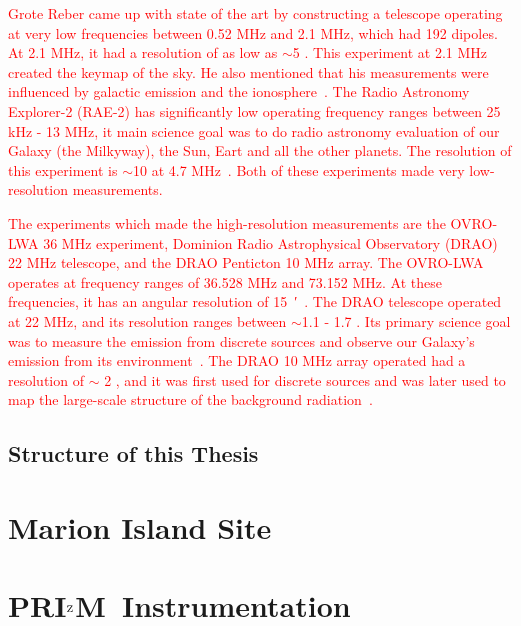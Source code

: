 \documentclass[12pt,a4paper]{report}
\def\prizm{PRI$^{\rm Z}$M}
\begin{document}
	    \textcolor{red}{Grote Reber came up with state of the art by constructing a telescope operating at very low frequencies between 0.52 MHz and 2.1 MHz, which had 192 dipoles. At 2.1 MHz, it had a resolution of as low as $\sim$5 \degree. This experiment at 2.1 MHz created the keymap of the sky. He also mentioned that his measurements were influenced by galactic emission and the ionosphere~\citep{article, 1988A&A...195..372W}. The Radio Astronomy Explorer-2 (RAE-2) has significantly low operating frequency ranges between 25 kHz - 13 MHz, it main science goal was to do radio astronomy evaluation of our Galaxy (the Milkyway), the Sun, Eart and all the other planets. The resolution of this experiment is $\sim$10 \degree at 4.7 MHz~\citep{1975A&A....40..365A}. Both of these experiments made very low-resolution measurements.\\}
	    	
	    \textcolor{red}{The experiments which made the high-resolution measurements are the OVRO-LWA 36 MHz experiment, Dominion Radio Astrophysical Observatory (DRAO) 22 MHz telescope, and the DRAO Penticton 10 MHz array. The OVRO-LWA operates at frequency ranges of 36.528 MHz and 73.152 MHz. At these frequencies, it has an angular resolution of \SI{15}{\arcminute}~\citep{2018AJ....156...32E}. The DRAO telescope operated at 22 MHz, and its resolution ranges between $\sim$1.1 \degree - 1.7 \degree. Its primary science goal was to measure the emission from discrete sources and observe our Galaxy's emission from its environment~\citep{1999A&AS..137....7R}. The DRAO 10 MHz array operated had a resolution of $\sim$ 2  \degree, and it was first used for discrete sources and was later used to map the large-scale structure of the background radiation~\citep{1976MNRAS.177..601C}.}
	    
	\section{Structure of this Thesis}


\chapter{Marion Island Site}

        \section{}
\chapter{\prizm~Instrumentation}
\end{document}
